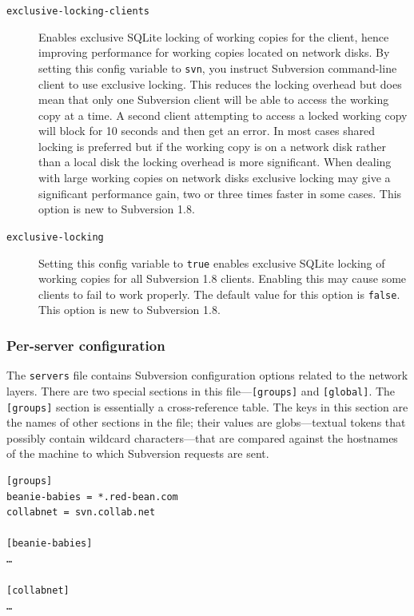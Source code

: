 \begin{description}
\item[\texttt{exclusive-locking-clients}]
Enables exclusive SQLite locking of working copies for the client, hence
improving performance for working copies located on network disks. By
setting this config variable to \texttt{svn}, you instruct Subversion
command-line client to use exclusive locking. This reduces the locking
overhead but does mean that only one Subversion client will be able to
access the working copy at a time. A second client attempting to access
a locked working copy will block for 10 seconds and then get an error.
In most cases shared locking is preferred but if the working copy is on
a network disk rather than a local disk the locking overhead is more
significant. When dealing with large working copies on network disks
exclusive locking may give a significant performance gain, two or three
times faster in some cases. This option is new to Subversion 1.8.
\item[\texttt{exclusive-locking}]
Setting this config variable to \texttt{true} enables exclusive SQLite
locking of working copies for all Subversion 1.8 clients. Enabling this
may cause some clients to fail to work properly. The default value for
this option is \texttt{false}. This option is new to Subversion 1.8.
\end{description}

\subsubsection{Per-server
configuration}\label{svn.advanced.confarea.opts.servers}

The \texttt{servers} file contains Subversion configuration options
related to the network layers. There are two special sections in this
file---\texttt{{[}groups{]}} and \texttt{{[}global{]}}. The
\texttt{{[}groups{]}} section is essentially a cross-reference table.
The keys in this section are the names of other sections in the file;
their values are globs---textual tokens that possibly contain wildcard
characters---that are compared against the hostnames of the machine to
which Subversion requests are sent.

\begin{verbatim}
[groups]
beanie-babies = *.red-bean.com
collabnet = svn.collab.net

[beanie-babies]
…

[collabnet]
…
\end{verbatim}

